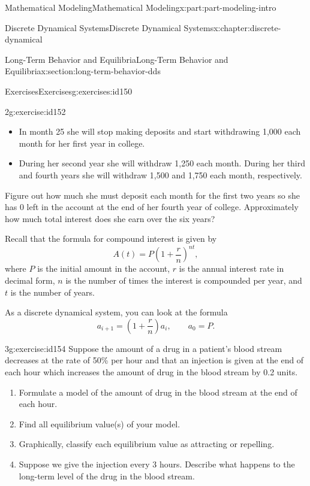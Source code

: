 \documentclass[oneside,10pt,]{book}
\numberwithin{equation}{section}
\begin{document}
\begin{partptx}{Mathematical Modeling}{}{Mathematical Modeling}{}{}{x:part:part-modeling-intro}
\begin{chapterptx}{Discrete Dynamical Systems}{}{Discrete Dynamical Systems}{}{}{x:chapter:discrete-dynamical}
\begin{sectionptx}{Long-Term Behavior and Equilibria}{}{Long-Term Behavior and Equilibria}{}{}{x:section:long-term-behavior-dds}
\begin{exercises-subsection-numberless}{Exercises}{}{Exercises}{}{}{g:exercises:id150}
\begin{divisionexercise}{2}{}{}{g:exercise:id152}
\begin{itemize}[label=\textbullet]
\item{}In month 25 she will stop making deposits and start withdrawing \textdollar{}1,000 each month for her first year in college.%
\item{}During her second year she will withdraw \textdollar{}1,250 each month. During her third and fourth years she will withdraw \textdollar{}1,500 and \textdollar{}1,750 each month, respectively.%
\end{itemize}
Figure out how much she must deposit each month for the first two years so she has \textdollar{}0 left in the account at the end of her fourth year of college. Approximately how much total interest does she earn over the six years?%
\par\smallskip%
\noindent\hypertarget{g:hint:id153}{}Recall that the formula for compound interest is given by%
%
\begin{equation*}
A(t) = P\left(1+\frac{r}{n}\right)^{nt},
\end{equation*}
where \(P\) is the initial amount in the account, \(r\) is the annual interest rate in decimal form, \(n\) is the number of times the interest is compounded per year, and \(t\) is the number of years.%
\par
As a discrete dynamical system, you can look at the formula%
%
\begin{equation*}
a_{i+1} = \left(1+\frac{r}{n}\right)a_i, \qquad a_0 = P.
\end{equation*}
\end{divisionexercise}%
\begin{divisionexercise}{3}{}{}{g:exercise:id154}%
Suppose the amount of a drug in a patient's blood stream decreases at the rate of 50\% per hour and that an injection is given at the end of each hour which increases the amount of drug in the blood stream by 0.2 units.%
\begin{enumerate}[font=\bfseries,label=(\alph*),ref=\alph*]
\item{}Formulate a model of the amount of drug in the blood stream at the end of each hour.%
\item{}Find all equilibrium value(s) of your model.%
\item{}Graphically, classify each equilibrium value as attracting or repelling.%
\item{}Suppose we give the injection every 3 hours. Describe what happens to the long-term level of the drug in the blood stream.%
\end{enumerate}
\end{divisionexercise}%

\end{exercises-subsection-numberless}
\end{sectionptx}
\end{chapterptx}
\end{partptx}
\end{document}

